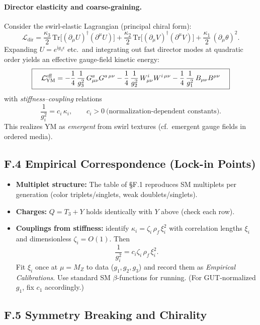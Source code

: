\documentclass[11pt]{article}
\newcommand{\Tr}{\mathrm{Tr}}
\newcommand{\ii}{\mathrm{i}}
\begin{document}
\paragraph{Director elasticity and coarse-graining.}
Consider the swirl-elastic Lagrangian (principal chiral form)\cite{Fradkin2013,Volovik2003,Cho1980,FaddeevNiemi1999}:
\[
\mathcal L_{\text{dir}}
=\frac{\kappa_3}{2}\,\Tr\!\big[(\partial_\mu U)^\dagger (\partial^\mu U)\big]
+\frac{\kappa_2}{2}\,\Tr\!\big[(\partial_\mu V)^\dagger (\partial^\mu V)\big]
+\frac{\kappa_1}{2}\,(\partial_\mu\theta)^2.
\]
Expanding $U=e^{\ii g_3 \epsilon}$ etc.\ and integrating out fast director modes at quadratic order yields an effective gauge-field kinetic energy:
\[
\boxed{\quad
\mathcal L_{\rm YM}^{\rm eff}
= -\frac{1}{4}\,\frac{1}{g_3^2}\,G^a_{\mu\nu}G^{a\,\mu\nu}
-\frac{1}{4}\,\frac{1}{g_2^2}\,W^i_{\mu\nu}W^{i\,\mu\nu}
-\frac{1}{4}\,\frac{1}{g_1^2}\,B_{\mu\nu}B^{\mu\nu}\quad}
\]
with \emph{stiffness--coupling} relations
\[
\frac{1}{g_i^2}=c_i\,\kappa_i,\qquad c_i>0\ \text{(normalization-dependent constants).}
\]
This realizes YM as \emph{emergent} from swirl textures (cf.\ emergent gauge fields in ordered media)\cite{Volovik2003,Fradkin2013,Zee2010,Wen2004}.

\subsection*{F.4 Empirical Correspondence (Lock-in Points)}
\begin{itemize}
\item \textbf{Multiplet structure:} The table of \S F.1 reproduces SM multiplets per generation (color triplets/singlets, weak doublets/singlets).
\item \textbf{Charges:} $Q=T_3+Y$ holds identically with $Y$ above (check each row).
\item \textbf{Couplings from stiffness:} identify $\kappa_i=\zeta_i\,\rho_{\!f}\,\xi_i^2$ with correlation lengths $\xi_i$ and dimensionless $\zeta_i=O(1)$. Then
\[
\frac{1}{g_i^2}=c_i\zeta_i\,\rho_{\!f}\,\xi_i^2.
\]
Fit $\xi_i$ once at $\mu=M_Z$ to data ($g_1,g_2,g_3$) and record them as \emph{Empirical Calibrations}. Use standard SM $\beta$-functions for running\cite{PDG2024}. (For GUT-normalized $g_1$, fix $c_1$ accordingly.)
\end{itemize}

\subsection*{F.5 Symmetry Breaking and Chirality}
\end{document}
